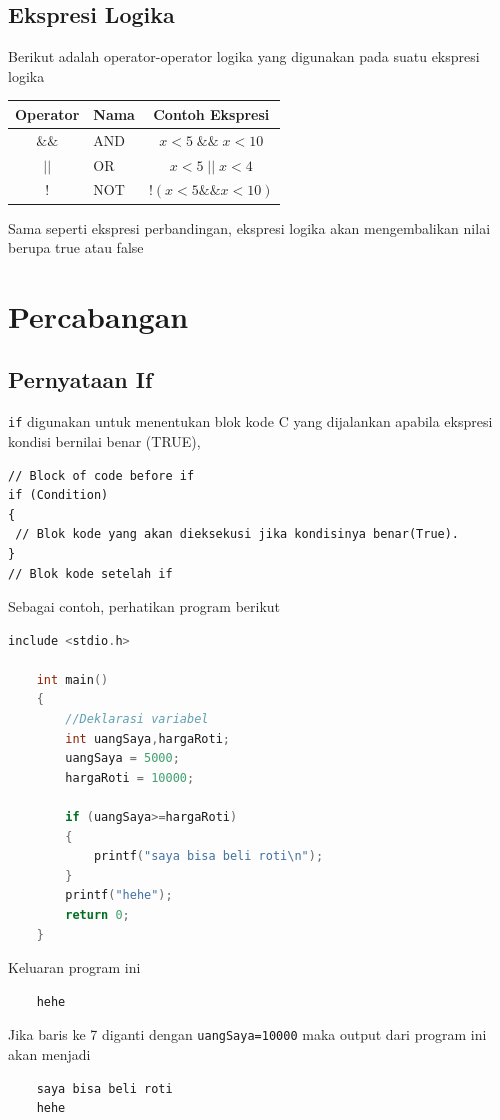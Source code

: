 \subsection{Ekspresi Logika}
Berikut adalah operator-operator logika yang digunakan pada suatu ekspresi logika
\begin{center}
	\begin{tabular}{|c|l|c|}
		\hline
		Operator & \multicolumn{1}{c|}{Nama} & Contoh Ekspresi \\ \hline
		$\&\&$    &  AND                & $x<5\; \&\& \;x<10$\\ \hline
		$||$    &  OR                 & $x < 5\; ||\; x < 4  $     \\ \hline
		$!$        & NOT                & $!(x <5 \&\& x < 10) $\\ \hline
	\end{tabular}
\end{center}
Sama seperti ekspresi perbandingan, ekspresi logika akan mengembalikan nilai berupa true atau false

\section{Percabangan}
\subsection{Pernyataan If}
\verb*|if| digunakan untuk menentukan blok kode C yang dijalankan apabila ekspresi kondisi bernilai benar (TRUE),
\begin{verbatim}
// Block of code before if
if (Condition) 
{
 // Blok kode yang akan dieksekusi jika kondisinya benar(True).
}
// Blok kode setelah if
\end{verbatim}
Sebagai contoh, perhatikan program berikut
\begin{lstlisting}[language=c,caption =Contoh Pernyataan If,label=lst:ifexample01]
	include <stdio.h>
	
	int main()
	{
		//Deklarasi variabel 
		int uangSaya,hargaRoti;
		uangSaya = 5000;
		hargaRoti = 10000;
		
		if (uangSaya>=hargaRoti)
		{
		    printf("saya bisa beli roti\n");
		}
		printf("hehe");
		return 0;
	}
\end{lstlisting}                        
Keluaran program ini
\begin{verbatim}
    hehe
\end{verbatim}
Jika baris ke 7 diganti dengan \verb|uangSaya=10000| maka output dari program ini akan menjadi
\begin{verbatim}
    saya bisa beli roti
    hehe
\end{verbatim}

